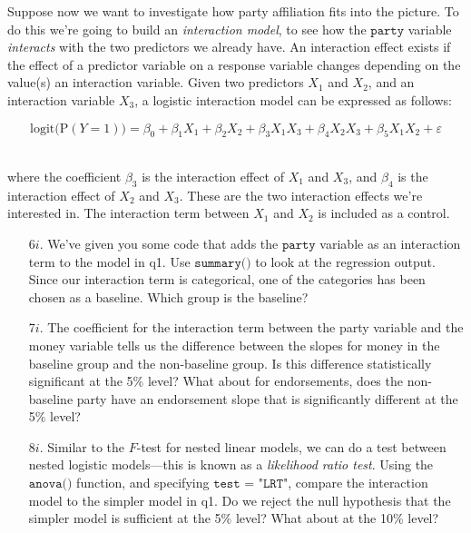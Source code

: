 \documentclass[10pt]{extarticle}
\renewcommand{\P}{\text{P}}
\begin{document}
Suppose now we want to investigate how party affiliation fits into the picture. To do this we're going to build an {\it interaction model}, to see how the $\texttt{party}$ variable {\it interacts} with the two predictors we already have. An interaction effect exists if the effect of a predictor variable on a response variable changes depending on the value(s) an interaction variable. Given two predictors $X_1$ and $X_2$, and an interaction variable $X_3$, a logistic interaction model can be expressed as follows:

$$\text{logit}\big( \P(Y=1) \big) = \beta_0 + \beta_1 X_1 + \beta_2 X_2 + \beta_3 X_1 X_3 + \beta_4 X_2 X_3 + \beta_5 X_1 X_2 + \varepsilon$$ \ 

where the coefficient $\beta_3$ is the interaction effect of $X_1$ and $X_3$, and $\beta_4$ is the interaction effect of $X_2$ and $X_3$. These are the two interaction effects we're interested in. The interaction term between $X_1$ and $X_2$ is included as a control.  \\ 


\begin{itemize}
		
	\item[6$i$.] We've given you some code that adds the $\texttt{party}$ variable as an interaction term to the model in q1. Use $\texttt{summary()}$ to look at the regression output. Since our interaction term is categorical, one of the categories has been chosen as a baseline. Which group is the baseline? \\ 
	
	\item[7$i$.] The coefficient for the interaction term between the party variable and the money variable tells us the difference between the slopes for money in the baseline group and the non-baseline group. Is this difference statistically significant at the 5\% level? What about for endorsements, does the non-baseline party have an endorsement slope that is significantly different at the 5\% level? \\ 
	
	\item[8$i$.] Similar to the $F$-test for nested linear models, we can do a test between nested logistic models---this is known as a {\it likelihood ratio test}. Using the $\texttt{anova()}$ function, and specifying $\texttt{test = "LRT"}$, compare the interaction model to the simpler model in q1. Do we reject the null hypothesis that the simpler model is sufficient at the 5\% level? What about at the 10\% level? 
    
\end{itemize}
\end{document}
